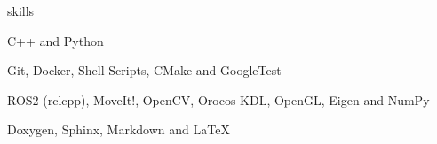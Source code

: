 \begin{section}{skills}

\begin{skills}

  \item {}
    {C++ and Python}

  \item {}
    {Git, Docker, Shell Scripts, CMake and GoogleTest}

  \item {}
    {ROS2 (rclcpp), MoveIt!, OpenCV, Orocos-KDL, OpenGL, Eigen and NumPy}

  \item {}
    {Doxygen, Sphinx, Markdown and LaTeX}





\end{skills}

\end{section}
